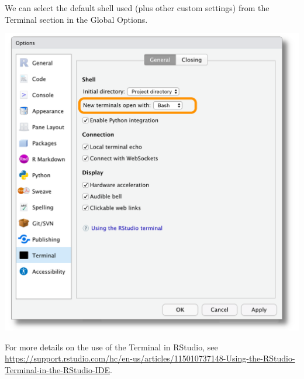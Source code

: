 \documentclass[
  11pt,
]{book}
\begin{document}
We can select the default shell used (plus other custom settings) from the Terminal section in the Global Options.

\begin{center}\includegraphics[width=0.8\linewidth]{images/terminal/terminal-settings} \end{center}

For more details on the use of the Terminal in RStudio, see \url{https://support.rstudio.com/hc/en-us/articles/115010737148-Using-the-RStudio-Terminal-in-the-RStudio-IDE}.
\end{document}
